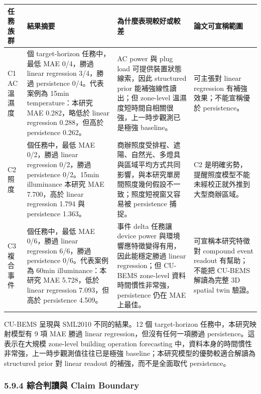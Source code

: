 \documentclass[12pt,a4paper]{article}
\begin{document}
\begin{table}[htbp]
\centering
\footnotesize
\renewcommand{\arraystretch}{1.25}
\begin{tabular}{|>{\raggedright\arraybackslash}p{}|>{\raggedright\arraybackslash}p{}|>{\raggedright\arraybackslash}p{}|>{\raggedright\arraybackslash}p{}|}
\hline
\textbf{任務族群} & \textbf{結果摘要} & \textbf{為什麼表現較好或較差} & \textbf{論文可宣稱範圍} \\
\hline
C1 AC 溫濕度 & 4 個 target-horizon 任務中，最低 MAE 0/4，勝過 linear regression 3/4，勝過 persistence 0/4。代表案例為 15min temperature：本研究 MAE 0.282，略低於 linear regression 0.288，但高於 persistence 0.262。 & AC power 與 plug load 可提供裝置狀態線索，因此 structured prior 能補強線性讀出；但 zone-level 溫濕度短時間自相關很強，上一時步觀測已是極強 baseline。 & 可主張對 linear regression 有補強效果；不能宣稱優於 persistence。 \\
\hline
C2 照度 & 2 個任務中，最低 MAE 0/2，勝過 linear regression 0/2，勝過 persistence 0/2。15min illuminance 本研究 MAE 7.700，高於 linear regression 1.794 與 persistence 1.363。 & 商辦照度受排程、遮陽、自然光、多燈具與區域平均方式共同影響，與本研究單房間照度幾何假設不一致；照度短視窗又容易被 persistence 捕捉。 & C2 是明確劣勢，提醒照度模型不能未經校正就外推到大型商辦區域。 \\
\hline
C3 複合事件 & 6 個任務中，最低 MAE 0/6，勝過 linear regression 6/6，勝過 persistence 0/6。代表案例為 60min illuminance：本研究 MAE 5.728，低於 linear regression 7.093，但高於 persistence 4.509。 & 事件 delta 任務讓 device power 與環境響應特徵變得有用，因此能穩定勝過 linear regression；但 CU-BEMS zone-level 資料時間慣性非常強，persistence 仍在 MAE 上最佳。 & 可宣稱本研究特徵對 compound event readout 有幫助；不能把 CU-BEMS 解讀為完整 3D spatial twin 驗證。 \\
\hline
\end{tabular}
\end{table}

CU-BEMS 呈現與 SML2010 不同的結果。12 個 target-horizon 任務中，本研究映射模型有 9 項 MAE 勝過 linear regression，但沒有任何一項勝過 persistence。這表示在大規模 zone-level building operation forecasting 中，資料本身的時間慣性非常強，上一時步觀測值往往已是極強 baseline；本研究模型的優勢較適合解讀為 structured prior 對 linear readout 的補強，而不是全面取代 persistence。


\subsubsection*{5.9.4 綜合判讀與 Claim Boundary}
\end{document}
